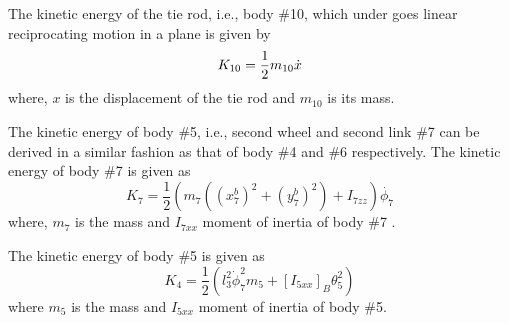 The kinetic energy of the tie rod, i.e., body \#10, which under goes linear reciprocating motion in a plane is given by
\begin{equation}
K_{10}=\frac{1}{2} m_{10} \dot{x}
\end{equation} where, $x$ is the displacement of the tie rod and $m_{10}$ is its mass.


The kinetic energy of body \#5, i.e., second wheel and second link \#7 can be derived in a similar fashion as that of body \#4 and \#6 respectively. The kinetic energy of body \#7 is given as
\begin{equation}
K_7=\frac{1}{2}(m_7((x^b_7)^2+(y^b_7)^2)+I_{7zz})\dot{\phi_7}
\end{equation}
where, $m_7$ is the mass and  $I_{7xx}$ moment of inertia of body \#7 .

The kinetic energy of body \#5  is given as
 \begin{equation}
K_4=\frac{1}{2}(l_3^2\dot\phi_7^2m_5+[I_{5xx}]_B\theta_5^2)
\end{equation} 
 where $m_5$  is the mass and $I_{5xx}$ moment of inertia of body \#5.
 

